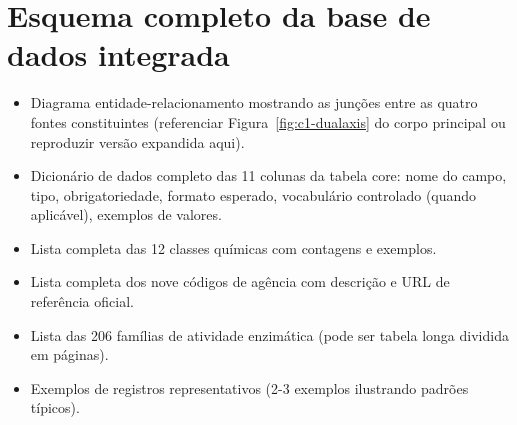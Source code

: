 \appendix

\chapter{Esquema completo da base de dados integrada}
\label{ape:esquema-db}


\begin{itemize}
    \item Diagrama entidade-relacionamento mostrando as junções entre as quatro fontes constituintes (referenciar Figura~\ref{fig:c1-dualaxis} do corpo principal ou reproduzir versão expandida aqui).
    \item Dicionário de dados completo das 11 colunas da tabela core: nome do campo, tipo, obrigatoriedade, formato esperado, vocabulário controlado (quando aplicável), exemplos de valores.
    \item Lista completa das 12 classes químicas com contagens e exemplos.
    \item Lista completa dos nove códigos de agência com descrição e URL de referência oficial.
    \item Lista das 206 famílias de atividade enzimática (pode ser tabela longa dividida em páginas).
    \item Exemplos de registros representativos (2-3 exemplos ilustrando padrões típicos).
\end{itemize}


